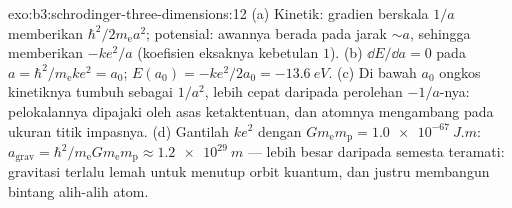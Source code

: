 \begin{solution}{exo:b3:schrodinger-three-dimensions:12}
(a) Kinetik: gradien berskala $1/a$ memberikan $\hbar^2/2m_{\text{e}}
a^2$; potensial: awannya berada pada jarak $\sim a$, sehingga memberikan
$-ke^2/a$ (koefisien eksaknya kebetulan $1$). (b) $\dd E/\dd
a = 0$ pada $a = \hbar^2/m_{\text{e}}ke^2 = a_0$; $E(a_0) =
-ke^2/2a_0 = \qty{-13.6}{eV}$. (c) Di bawah $a_0$ ongkos kinetiknya
tumbuh sebagai $1/a^2$, lebih cepat daripada perolehan $-1/a$-nya:
pelokalannya dipajaki oleh asas ketaktentuan, dan atomnya mengambang
pada ukuran titik impasnya. (d) Gantilah $ke^2$ dengan $Gm_{\text{e}}m_{\text{p}} =
\qty{1.0e-67}{J.m}$: $a_{\text{grav}} = \hbar^2/m_{\text{e}}G
m_{\text{e}}m_{\text{p}} \approx \qty{1.2e29}{m}$ --- lebih besar
daripada semesta teramati: gravitasi terlalu lemah untuk menutup orbit
kuantum, dan justru membangun bintang alih-alih atom.
\end{solution}

